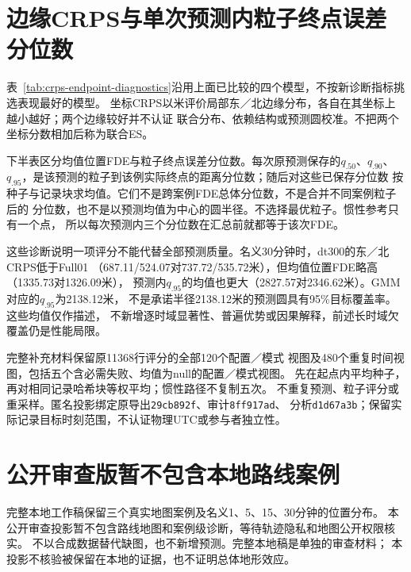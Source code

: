



\section{边缘CRPS与单次预测内粒子终点误差分位数}
\label{sec:secondary-score-diagnostics}\hypertarget{sec:secondary-score-diagnostics}{}
表~\ref{tab:crps-endpoint-diagnostics}沿用上面已比较的四个模型，不按新诊断指标挑选表现最好的模型。
坐标CRPS以米评价局部东／北边缘分布，各自在其坐标上越小越好；两个边缘较好并不认证
联合分布、依赖结构或预测圆校准。不把两个坐标分数相加后称为联合ES。

下半表区分均值位置FDE与粒子终点误差分位数。每次原预测保存的$q_{.50}$、$q_{.90}$、
$q_{.95}$，是该预测的粒子到该例实际终点的距离分位数；随后对这些已保存分位数
按种子与记录块求均值。它们不是跨案例FDE总体分位数，不是合并不同案例粒子后的
分位数，也不是以预测均值为中心的圆半径。不选择最优粒子。惯性参考只有一个点，
所以每次预测内三个分位数在汇总前就都等于该次FDE。

这些诊断说明一项评分不能代替全部预测质量。名义30分钟时，dt300的东／北CRPS低于Full01
（687.11/524.07对737.72/535.72米），但均值位置FDE略高（1335.73对1326.09米），
预测内$q_{.95}$的均值也更大（2827.57对2346.62米）。GMM对应的$q_{.95}$为2138.12米，
不是承诺半径2138.12米的预测圆具有95\%目标覆盖率。这些均值仅作描述，
不新增逐时域显著性、普遍优势或因果解释，前述长时域欠覆盖仍是性能局限。

完整补充材料保留原11368行评分的全部120个配置／模式
视图及480个重复时间视图，包括五个含必需失败、均值为null的配置／模式视图。
先在起点内平均种子，再对相同记录哈希块等权平均；惯性路径不复制五次。
不重复预测、粒子评分或重采样。匿名投影绑定原导出\texttt{29cb892f}、审计\texttt{8ff917ad}、
分析\texttt{d1d67a3b}；保留实际记录目标时刻范围，不认证物理UTC或参与者独立性。



\section{公开审查版暂不包含本地路线案例}
\label{sec:case-horizons}\hypertarget{sec:case-horizons}{}
完整本地工作稿保留三个真实地图案例及名义1、5、15、30分钟的位置分布。
本公开审查投影暂不包含路线地图和案例级诊断，等待轨迹隐私和地图公开权限核实。
不以合成数据替代缺图，也不新增预测。完整本地稿是单独的审查材料；
本投影不核验被保留在本地的证据，也不证明总体地形效应。

\clearpage

